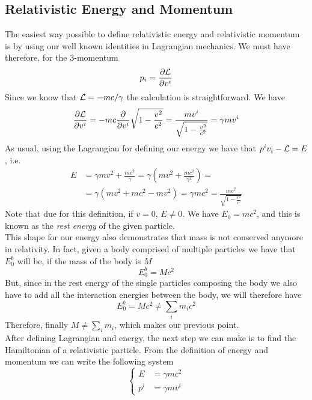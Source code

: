 \documentclass[../admech.tex]{subfiles}
\begin{document}
\subsection{Relativistic Energy and Momentum}
The easiest way possible to define relativistic energy and relativistic momentum is by using our well known identities in Lagrangian mechanics. We must have therefore, for the 3-momentum
\begin{equation}
	p_i=\pdv{\mathcal{L}}{v^i}
	\label{eq:relmom}
\end{equation}
Since we know that $\mathcal{L}=-mc/\gamma$ the calculation is straightforward. We have
\begin{equation*}
	\pdv{\mathcal{L}}{v^i}=-mc\pdv{v^i}\sqrt{1-\frac{v^2}{c^2}}=\frac{mv^i}{\sqrt{1-\frac{v^2}{c^2}}}=\gamma mv^i
\end{equation*}
As usual, using the Lagrangian for defining our energy we have that $p^iv_i-\mathcal{L}=E$, i.e.
\begin{equation}
	\begin{aligned}
		E&=\gamma mv^2+\frac{mc^2}{\gamma}=\gamma\left( mv^2+\frac{mc^2}{\gamma^2} \right)=\\
		&=\gamma\left( mv^2+mc^2-mv^2 \right)=\gamma mc^2=\frac{mc^2}{\sqrt{1-\frac{v^2}{c^2}}}
	\end{aligned}
	\label{eq:relen}
\end{equation}
Note that due for this definition, if $v=0$, $E\ne0$. We have $E_0=mc^2$, and this is known as the \emph{rest energy} of the given particle.\\
This shape for our energy also demonstrates that mass is not conserved anymore in relativity. In fact, given a body comprised of multiple particles we have that $E_0^{b}$ will be, if the mass of the body is $M$
\begin{equation}
	E_0^b=Mc^2
	\label{eq:restmassbigb}
\end{equation}
But, since in the rest energy of the single particles composing the body we also have to add all the interaction energies between the body, we will therefore have
\begin{equation}
	E_0^b=Mc^2\ne\sum_im_ic^2
	\label{eq:mnoteq}
\end{equation}
Therefore, finally $M\ne\sum_im_i$, which makes our previous point.\\
After defining Lagrangian and energy, the next step we can make is to find the Hamiltonian of a relativistic particle. From the definition of energy and momentum we can write the following system
\begin{equation}
	\left\{ \begin{aligned}
		E&=\gamma mc^2\\
		p^i&=\gamma mv^i
\end{aligned}\right.
	\label{eq:invertlor}
\end{equation}
\end{document}
